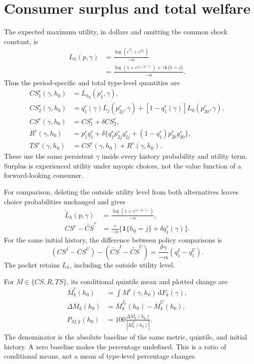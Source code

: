 \documentclass[11pt]{article}
\newcommand{\ind}{\mathbf{1}}
\newcommand{\dd}{\,\mathrm{d}}
\begin{document}
\section{Consumer surplus and total welfare}
The expected maximum utility, in dollars and omitting the common shock
constant, is
\begin{align}
 L_h(p,\gamma)
 &=\frac{\log(e^{V_j}+e^{V_0})}{-\alpha}\\
 &=\frac{\log(1+e^{z_h(p,\gamma)})+\gamma\ind\{h=j\}}{-\alpha}.
\end{align}
Thus the period-specific and total type-level quantities are
\begin{align}
 CS_1^r(\gamma,h_0)&=L_{h_0}(p_1^r,\gamma),\\
 CS_2^r(\gamma,h_0)&=q_1^r(\gamma)L_j(p_{2j}^r,\gamma)
 +[1-q_1^r(\gamma)]L_0(p_{20}^r,\gamma),\\
 CS^r(\gamma,h_0)&=CS_1^r+\delta CS_2^r,\\
 R^r(\gamma,h_0)&=p_1^rq_1^r+\delta\{q_1^rp_{2j}^rq_{2j}^r
 +(1-q_1^r)p_{20}^rq_{20}^r\},\\
 TS^r(\gamma,h_0)&=CS^r(\gamma,h_0)+R^r(\gamma,h_0).
\end{align}
These use the same persistent $\gamma$ inside every history probability and
utility term. Surplus is experienced utility under myopic choices, not the
value function of a forward-looking consumer.

For comparison, deleting the outside utility level from both alternatives
leaves choice probabilities unchanged and gives
\begin{align}
 \widetilde L_h(p,\gamma)&=\frac{\log(1+e^{z_h(p,\gamma)})}{-\alpha},\\
 CS^r-\widetilde{CS}^r
 &=\frac{\gamma}{-\alpha}\{\ind\{h_0=j\}+\delta q_1^r(\gamma)\}.
\end{align}
For the same initial history, the difference between policy comparisons is
\begin{equation}
 (CS^I-CS^U)-(\widetilde{CS}^I-\widetilde{CS}^U)
 =\frac{\delta\gamma}{-\alpha}(q_1^I-q_1^U).
\end{equation}
The packet retains $L_h$, including the outside utility level.

For $M\in\{CS,R,TS\}$, its conditional quintile mean and plotted change are
\begin{align}
 \overline M_k^r(h_0)&=\int M^r(\gamma,h_0)\dd F_k(\gamma),\\
 \Delta\overline M_k(h_0)&=\overline M_k^{I_k}(h_0)-\overline M_k^U(h_0),\\
 P_{M,k}(h_0)&=100\frac{\Delta\overline M_k(h_0)}{|\overline M_k^U(h_0)|}.
\end{align}
The denominator is the absolute baseline of the same metric, quintile, and
initial history. A zero baseline makes the percentage undefined. This is
a ratio of conditional means, not a mean of type-level percentage changes.
\end{document}
